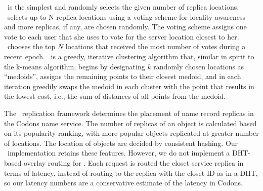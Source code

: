 \uniform\ is the simplest and randomly selects the given number of replica locations. \locaware\ selects up to N  replica locations using a voting scheme for locality-awareness and more replicas, if any, are chosen randomly. The voting scheme assigns one vote to each user that she uses to vote for the server location closest to her.  \locaware\ chooses the top $N$ locations that received the most number of votes during a recent epoch. \kmedoids\ is a greedy, iterative clustering algorithm \cite{kmedoids} that, similar in spirit to the k-means algorithm, begins by designating $k$ randomly chosen locations as ``medoids'', assigns the remaining points to their closest medoid, and in each iteration greedily swaps the medoid in each cluster with the point that results in the lowest cost, i.e., the sum of distances of all points from the medoid.


The \beehive\ replication framework determines the placement of name record replicas in the Codons name service. 
The number of replicas of an object is calculated based on its popularity ranking, with more popular objects replicated at greater number of  locations. 
The location of objects are decided by consistent hashing.
Our \beehive\ implementation retains these features.
However, we do not implement a DHT-based overlay routing for \beehive.
Each request is routed the closet service replica in terms of latency,  instead of routing to the replica with the closet ID as in a DHT, so our latency numbers are a conservative estimate of the latency in Codons.



